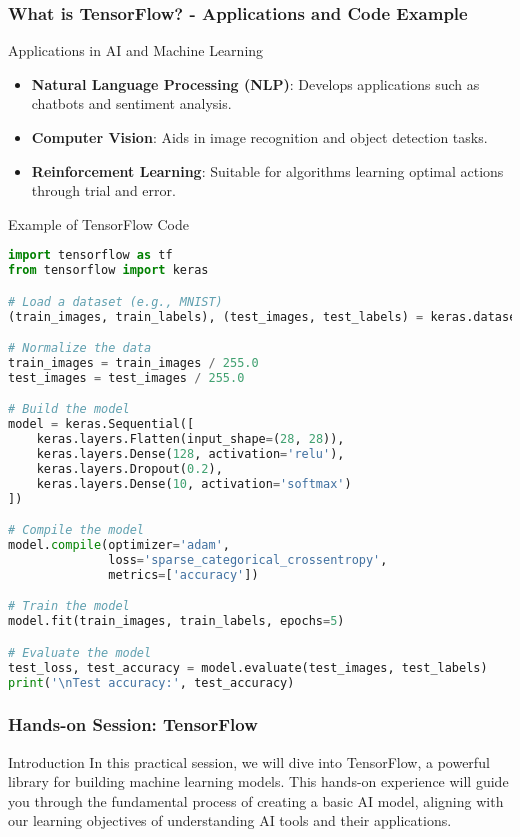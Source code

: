 \documentclass[aspectratio=169]{beamer}
\begin{document}
\begin{frame}[fragile]
    \frametitle{What is TensorFlow? - Applications and Code Example}
    \begin{block}{Applications in AI and Machine Learning}
        \begin{itemize}
            \item \textbf{Natural Language Processing (NLP)}: Develops applications such as chatbots and sentiment analysis.
            \item \textbf{Computer Vision}: Aids in image recognition and object detection tasks.
            \item \textbf{Reinforcement Learning}: Suitable for algorithms learning optimal actions through trial and error.
        \end{itemize}
    \end{block}
    
    \begin{block}{Example of TensorFlow Code}
        \begin{lstlisting}[language=Python]
import tensorflow as tf
from tensorflow import keras

# Load a dataset (e.g., MNIST)
(train_images, train_labels), (test_images, test_labels) = keras.datasets.mnist.load_data()

# Normalize the data
train_images = train_images / 255.0
test_images = test_images / 255.0

# Build the model
model = keras.Sequential([
    keras.layers.Flatten(input_shape=(28, 28)),
    keras.layers.Dense(128, activation='relu'),
    keras.layers.Dropout(0.2),
    keras.layers.Dense(10, activation='softmax')
])

# Compile the model
model.compile(optimizer='adam',
              loss='sparse_categorical_crossentropy',
              metrics=['accuracy'])

# Train the model
model.fit(train_images, train_labels, epochs=5)

# Evaluate the model
test_loss, test_accuracy = model.evaluate(test_images, test_labels)
print('\nTest accuracy:', test_accuracy)
        \end{lstlisting}
    \end{block}
\end{frame}

\begin{frame}[fragile]
    \frametitle{Hands-on Session: TensorFlow}
    \begin{block}{Introduction}
        In this practical session, we will dive into TensorFlow, a powerful library for building machine learning models. This hands-on experience will guide you through the fundamental process of creating a basic AI model, aligning with our learning objectives of understanding AI tools and their applications.
    \end{block}
\end{frame}
\end{document}
